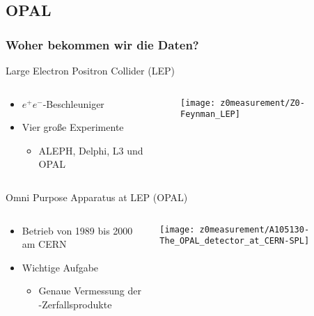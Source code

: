  \subsection{OPAL}
 \begin{frame}
   \frametitle{Woher bekommen wir die Daten?}
   \begin{block}{Large Electron Positron Collider (LEP)}
     \begin{columns}[T]
       \begin{column}{0.6\textwidth}
         \begin{itemize}
         \item $e^{+}e^{-}$-Beschleuniger
        \item Vier gro\ss{}e Experimente
           \begin{itemize}
           \item ALEPH, Delphi, L3 und OPAL
           \end{itemize}
         \end{itemize}
       \end{column}
       \begin{column}{0.4\textwidth}
         \vskip-0.5cm
         \centering
         \texttt{[image: z0measurement/Z0-Feynman\_LEP]}
       \end{column}
     \end{columns}
   \end{block}
   \pause
   \begin{block}{Omni Purpose Apparatus at LEP (OPAL)}
     \begin{columns}
       \begin{column}{0.6\textwidth}
         \begin{itemize}
         \item Betrieb von 1989 bis 2000 am CERN
         \item Wichtige Aufgabe
           \begin{itemize}
           \item Genaue Vermessung der \znull-Zerfallsprodukte
           \end{itemize}
         \end{itemize}
       \end{column}
       \begin{column}{0.4\textwidth}
         \vskip-0.5cm
         \centering
         \texttt{[image: z0measurement/A105130-The\_OPAL\_detector\_at\_CERN-SPL]}
       \end{column}
     \end{columns}
   \end{block}
 \end{frame}

